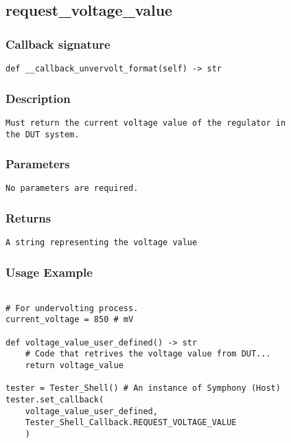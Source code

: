 \subsection{request\_voltage\_value}

\subsubsection{Callback signature}
\begin{lstlisting}
def __callback_unvervolt_format(self) -> str
\end{lstlisting}

\subsubsection{Description}
\begin{lstlisting}[mathescape=true, keywordstyle=\color{black}, showstringspaces=false]
Must return the current voltage value of the regulator in 
the DUT system.
\end{lstlisting}

\subsubsection{Parameters}
\begin{lstlisting}[mathescape=true, keywordstyle=\color{black}]
No parameters are required.
\end{lstlisting}

\subsubsection{Returns}
\begin{lstlisting}[mathescape=true, keywordstyle=\color{black}]
A string representing the voltage value
\end{lstlisting}


\subsubsection{Usage Example}
\begin{lstlisting}

# For undervolting process.
current_voltage = 850 # mV

def voltage_value_user_defined() -> str
    # Code that retrives the voltage value from DUT...
    return voltage_value

tester = Tester_Shell() # An instance of Symphony (Host)
tester.set_callback(
    voltage_value_user_defined,
    Tester_Shell_Callback.REQUEST_VOLTAGE_VALUE
    )

\end{lstlisting}
